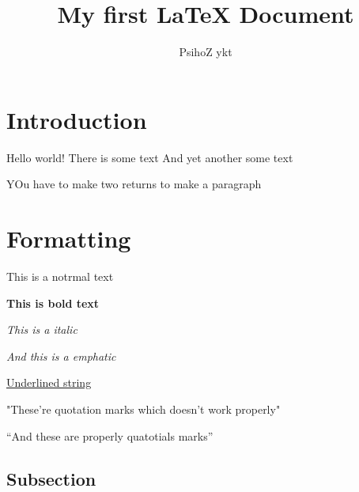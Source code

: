 \documentclass{article}
\author{PsihoZ ykt}
\title{My first {\LaTeX} Document}
\begin{document}
\maketitle

\section{Introduction}

Hello world!
There is some text
And yet another some text

YOu have to make two returns to make a paragraph


\section{Formatting}

This is a notrmal text

\textbf{This is bold text}

\textit{This is a italic}

\emph{And this is a emphatic}

\underline{Underlined string}

"These're  quotation marks which doesn't work properly"

``And these are properly quatotials marks''

\subsection{Subsection}
\end{document}
